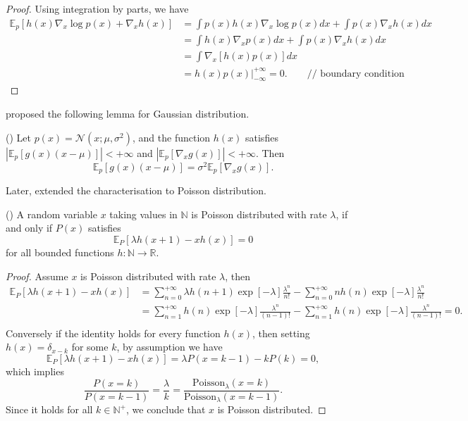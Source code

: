 \begin{proof}
Using integration by parts, we have
\begin{equation*}
\begin{aligned}
\mathbb{E}_{p}[h(x) \nabla_{x} \log p(x) + \nabla_{x} h(x) ] &= \int p(x) h(x) \nabla_{x} \log p(x) dx + \int p(x) \nabla_{x} h(x) dx \\
&= \int h(x) \nabla_{x} p(x) dx + \int p(x) \nabla_{x} h(x) dx \\
&= \int \nabla_{x} [h(x) p(x)] dx \\
&= h(x) p(x) |_{-\infty}^{+\infty} = 0. \quad\quad \text{// boundary condition}
\end{aligned}
\end{equation*}
\end{proof}

\cite{stein:stein_method1972} proposed the following lemma for Gaussian distribution.
\begin{lemma}
(\citep{stein:stein_method1972})
Let $p(x) = \mathcal{N}(x; \mu, \sigma^2)$, and the function $h(x)$ satisfies $| \mathbb{E}_{p}[g(x) (x - \mu)] |< +\infty$ and $|\mathbb{E}_{p}[\nabla_{x} g(x)] | < +\infty$. Then
$$ \mathbb{E}_{p}[g(x) (x - \mu)] = \sigma^2 \mathbb{E}_p[\nabla_{x} g(x)]. $$
\end{lemma}

Later, \cite{chen:poisson1975} extended the characterisation to Poisson distribution.
\begin{lemma}
(\citep{chen:poisson1975}) A random variable $x$ taking values in $\mathbb{N}$ is Poisson distributed with rate $\lambda$, if and only if $P(x)$ satisfies
$$ \mathbb{E}_{P}[ \lambda h(x+1) - xh(x) ] = 0 $$
for all bounded functions $h: \mathbb{N} \rightarrow \mathbb{R}$.
\end{lemma}
\begin{proof}
Assume $x$ is Poisson distributed with rate $\lambda$, then
\begin{equation*}
\begin{aligned}
\mathbb{E}_{P}[ \lambda h(x+1) - xh(x) ] 
& = \sum_{n=0}^{+\infty} \lambda h(n+1) \exp[-\lambda] \frac{\lambda^n}{n!} - \sum_{n=0}^{+\infty} n h(n) \exp[-\lambda] \frac{\lambda^n}{n!} \\
& = \sum_{n=1}^{+\infty} h(n) \exp[-\lambda] \frac{\lambda^n}{(n-1)!} - \sum_{n=1}^{+\infty} h(n) \exp[-\lambda] \frac{\lambda^n}{(n - 1)!} = 0. \\
\end{aligned}
\end{equation*}
Conversely if the identity holds for every function $h(x)$, then setting $h(x) = \delta_{x - k}$ for some $k$, by assumption we have
$$ \mathbb{E}_{P}[ \lambda h(x+1) - xh(x) ] = \lambda P(x = k - 1) - k P(k) = 0,$$
which implies 
$$ \frac{P(x = k)}{P(x = k-1)} = \frac{\lambda}{k} = \frac{\text{Poisson}_{\lambda}( x = k)}{ \text{Poisson}_{\lambda}( x = k - 1) }.$$
Since it holds for all $k \in \mathbb{N}^{+}$, we conclude that $x$ is Poisson distributed.
\end{proof}
